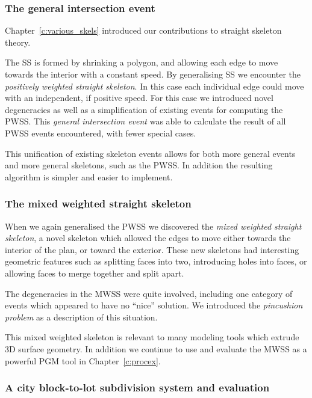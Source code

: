 \subsubsection{The general intersection event}

Chapter~\ref{c:various_skels} introduced our contributions to straight skeleton theory. 

The SS is formed by shrinking a polygon, and allowing each edge to move towards the interior with a constant speed. By generalising SS we encounter the \emph{positively weighted straight skeleton}. In this case each individual edge could move with an independent, if positive speed. For this case we introduced novel degeneracies as well as a simplification of existing events for computing the PWSS. This \emph{general intersection event} was able to calculate the result of all PWSS events encountered, with fewer special cases.

This unification of existing skeleton events allows for both more general events and more general skeletons, such as the PWSS. In addition the resulting algorithm is simpler and easier to implement.

\subsubsection{The mixed weighted straight skeleton}

When we again generalised the PWSS we discovered the \emph{mixed weighted straight skeleton}, a novel skeleton which allowed the edges to move either towards the interior of the plan, or toward the exterior. These new skeletons had interesting geometric features such as splitting faces into two, introducing holes into faces, or allowing faces to merge together and split apart.

The degeneracies in the MWSS were quite involved, including one category of events which appeared to have no ``nice'' solution. We introduced the \emph{pincushion problem} as a description of this situation.

This mixed weighted skeleton is relevant to many modeling tools which extrude 3D surface geometry. In addition we continue to use and evaluate the MWSS as a powerful PGM tool in Chapter~\ref{c:procex}.

\subsubsection{A city block-to-lot subdivision system and evaluation}

